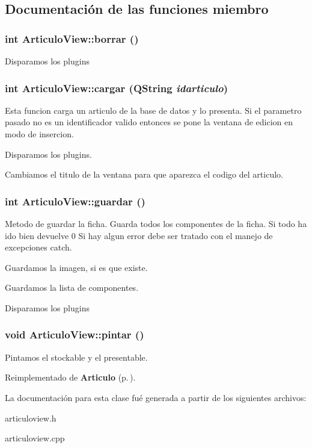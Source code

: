 \subsection{Documentaci\'{o}n de las funciones miembro}
\subsubsection{\setlength{\rightskip}{0pt plus 5cm}int Articulo\-View::borrar ()}\label{classArticuloView_a1}


Disparamos los plugins 
\subsubsection{\setlength{\rightskip}{0pt plus 5cm}int Articulo\-View::cargar (QString {\em idarticulo})}\label{classArticuloView_a2}


Esta funcion carga un articulo de la base de datos y lo presenta. Si el parametro pasado no es un identificador valido entonces se pone la ventana de edicion en modo de insercion.

Disparamos los plugins.

Cambiamos el titulo de la ventana para que aparezca el codigo del articulo. 
\subsubsection{\setlength{\rightskip}{0pt plus 5cm}int Articulo\-View::guardar ()}\label{classArticuloView_a6}


Metodo de guardar la ficha. Guarda todos los componentes de la ficha. Si todo ha ido bien devuelve 0 Si hay algun error debe ser tratado con el manejo de excepciones catch.

Guardamos la imagen, si es que existe.

Guardamos la lista de componentes.

Disparamos los plugins 
\subsubsection{\setlength{\rightskip}{0pt plus 5cm}void Articulo\-View::pintar ()\hspace{0.3cm}{\tt  [virtual]}}\label{classArticuloView_a7}


Pintamos el stockable y el presentable. 

Reimplementado de {\bf Articulo} {\rm (p.\,\pageref{classArticulo_a15})}.

La documentaci\'{o}n para esta clase fu\'{e} generada a partir de los siguientes archivos:\begin{CompactItemize}
\item 
articuloview.h\item 
articuloview.cpp\end{CompactItemize}
